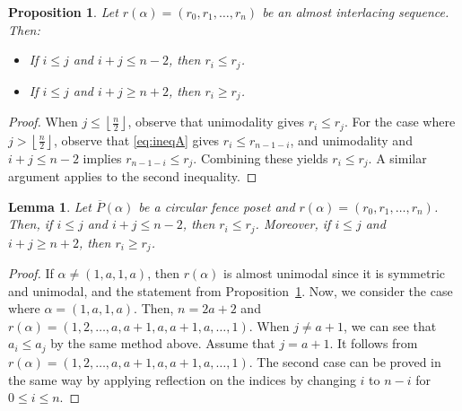 \documentclass{article}
\newtheorem{lemma}{Lemma}
\newtheorem{prop}{Proposition}
\theoremstyle{remark}
\begin{document}
\begin{prop}\label{prop:almint}
Let \( r(\alpha) = (r_0, r_1, \ldots, r_{n}) \) be an almost interlacing sequence. Then:
\begin{itemize}
    \item If \( i \leq j \) and \( i + j \leq n - 2 \), then \( r_i \leq r_j \).
    \item If \( i \leq j \) and \( i + j \geq n + 2 \), then \( r_i \geq r_j \).
\end{itemize}
\end{prop}

\begin{proof}
When \( j \leq \left\lfloor \frac{n}{2} \right\rfloor \), observe that unimodality gives \( r_i \leq r_j \). For the case where \( j > \left\lfloor \frac{n}{2} \right\rfloor \), observe that \eqref{eq:ineqA} gives \( r_i \leq r_{n-1  - i} \), and unimodality and \( i + j \leq n - 2 \) implies \( r_{n  -1- i} \leq r_j \). Combining these yields \( r_i \leq r_j \). A similar argument applies to the second inequality.
\end{proof}

\begin{lemma}\label{lem:left}
    Let $\overline{P}(\alpha)$ be a circular fence poset and $r(\alpha)=(r_0,r_1,\dots,r_n)$. Then, if $i\le j$ and $i+j\le n-2$, then $r_i\le r_j$. Moreover, if $i\le j$ and $i+j\ge n+2$, then $r_i\ge r_j$.
\end{lemma}
\begin{proof}
If $\alpha\neq(1,a,1,a)$, then $r(\alpha)$ is almost unimodal since it is symmetric and unimodal, and the statement from Proposition~\ref{prop:almint}. Now, we consider the case where $\alpha=(1,a,1,a)$. Then, $n=2a+2$ and $r(\alpha)=(1,2,\dots,a,a+1,a,a+1,a,\dots,1)$. When $j\neq a+1$, we can see that $a_i\le a_j$ by the same method above. Assume that $j=a+1$. It follows from $r(\alpha)=(1,2,\dots,a,a+1,a,a+1,a,\dots,1)$. The second case can be proved in the same way by applying reflection on the indices by changing $i$ to $n-i$ for $0\leq i \leq n$.
\end{proof}
\end{document}
